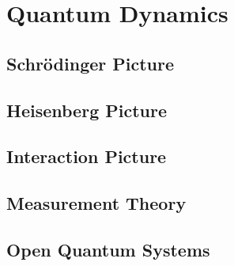 \chapter{Quantum Dynamics}

\section{Schrödinger Picture}

\section{Heisenberg Picture}

\section{Interaction Picture}

\section{Measurement Theory}

\section{Open Quantum Systems}





